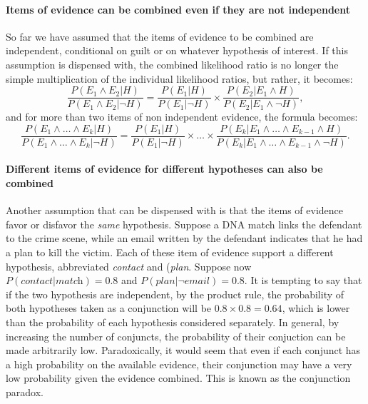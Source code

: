 \documentclass[10pt]{article}
\begin{document}
\paragraph{Items of evidence can be combined 
even if they are not independent}

So far we have assumed that the items of evidence to be combined are independent, 
conditional on guilt or on whatever hypothesis of interest. 
%
%
If this assumption is dispensed with, the combined likelihood ratio is no longer the simple 
multiplication of the individual likelihood ratios, 
but rather, it becomes:
%
\[\frac{P(E_1\wedge E_2 | H)}{P(E_1\wedge E_2 | \neg H)}=\frac{P(E_1| H)}{P(E_1| \neg H)}\times \frac{P(E_2 | E_1\wedge H)}{P(E_2| E_1\wedge \neg H)},\]
%
and for more than two items of non independent evidence, the formula becomes:
%
\[\frac{P(E_1\wedge \dots \wedge E_k | H)}{P(E_1\wedge \dots \wedge E_k | \neg H)}=\frac{P(E_1| H)}{P(E_1| \neg H)} \times \dots \times \frac{P(E_k | E_1  \wedge \dots \wedge E_{k-1} \wedge H)}{P(E_k| E_1 \wedge \dots \wedge E_{k-1} \wedge \neg H)} .\]




\paragraph{Different items of evidence for different hypotheses can also be combined}

Another assumption that can be dispensed with is that the items of evidence favor or disfavor the \textit{same} hypothesis. %
Suppose a DNA match links the defendant to the crime scene, while an email written by the defendant indicates 
that he had a plan to kill the victim. Each of these item of evidence support a different hypothesis, abbreviated
 \textit{contact} and (\textit{plan}.
Suppose now $P( \textit{contact} | \textit{match})= 0.8$ and $P(\textit{plan} | \neg \textit{email})=0.8$. It is tempting 
to say that if the two hypothesis are independent, by the product rule, the probability of both hypotheses taken 
as a conjunction will be $0.8\times 0.8=0.64$, which is lower than the probability 
of each hypothesis considered separately.
%
%
In general, by increasing the number of conjuncts, 
the probability of their conjuction can be made arbitrarily low. 
Paradoxically, it would seem that even if each conjunct has 
a high probability on the available evidence, their conjunction may have 
a very low probability given the evidence combined. 
This is known as the conjunction paradox. %
\end{document}
